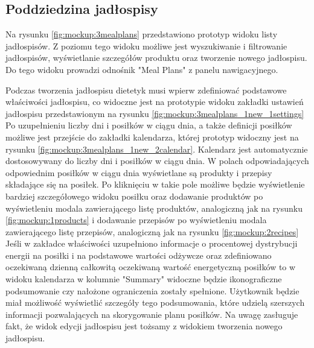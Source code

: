 

\subsection{Poddziedzina jadłospisy}

Na rysunku \ref{fig:mockup:3mealplans} przedstawiono prototyp widoku listy jadłospisów.
Z poziomu tego widoku możliwe jest wyszukiwanie i filtrowanie jadłospisów, wyświetlanie szczegółów produktu oraz tworzenie nowego jadłospisu.
Do tego widoku prowadzi odnośnik "Meal Plans" z panelu nawigacyjnego.


Podczas tworzenia jadłospisu dietetyk musi wpierw zdefiniować podstawowe właściwości jadłospisu, co widoczne jest na prototypie widoku zakładki ustawień jadłospisu przedstawionym na rysunku \ref{fig:mockup:3mealplans_1new_1settings}
Po uzupełnieniu liczby dni i posiłków w ciągu dnia, a także definicji posiłków możliwe jest przejście do zakładki kalendarza, której prototyp widoczny jest na rysunku \ref{fig:mockup:3mealplans_1new_2calendar}.
Kalendarz jest automatycznie dostosowywany do liczby dni i posiłków w ciągu dnia.
W polach odpowiadających odpowiednim posiłków w ciągu dnia wyświetlane są produkty i przepisy składające się na posiłek.
Po kliknięciu w takie pole możliwe będzie wyświetlenie bardziej szczegółowego widoku posiłku
oraz dodawanie produktów po wyświetleniu modala zawierającego listę produktów, analogiczną jak na rysunku \ref{fig:mockup:1products}
i dodawanie przepisów po wyświetleniu modala zawierającego listę przepisów, analogiczną jak na rysunku \ref{fig:mockup:2recipes}
Jeśli w zakładce właściwości uzupełniono informacje o procentowej dystrybucji energii na posiłki i na podstawowe wartości odżywcze
oraz zdefiniowano oczekiwaną dzienną całkowitą oczekiwaną wartość energetyczną posiłków
to w widoku kalendarza w kolumnie "Summary" widoczne będzie ikonograficzne podsumowanie czy nałożone ograniczenia zostały spełnione.
Użytkownik będzie miał możliwość wyświetlić szczegóły tego podsumowania, które udzielą szerszych informacji pozwalających na skorygowanie planu posiłków.
Na uwagę zasługuje fakt, że widok edycji jadłospisu jest tożsamy z widokiem tworzenia nowego jadłospisu.

